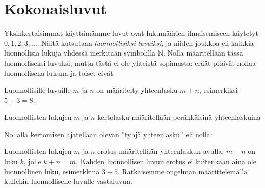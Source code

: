 
% 
% 
% 


% 
% 
% 

\chapter{Kokonaisluvut}

Yksinkertaisimmat käyttämämme luvut ovat lukumäärien ilmaisemiseen käytetyt $0, 1, 2, 3, \ldots$. Näitä kutsutaan \emph{luonnollisiksi luvuiksi}, ja niiden joukkoa eli kaikkia luonnollisia lukuja yhdessä merkitään symbolilla $\mathbb{N}$.
Nolla määritellään tässä luonnolliseksi luvuksi, mutta tästä ei ole yhteistä sopimusta: eräät pitävät nollaa luonnollisena lukuna ja toiset eivät.

Luonnollisille luvuille $m$ ja $n$ on määritelty yhteenlasku $m + n$, esimerkiksi $5 + 3 = 8$.

Luonnollisten lukujen $m$ ja $n$ kertolasku määritellään peräkkäisinä yhteenlaskuina
\laatikko{
\[m \cdot n = \underbrace{m + m + \ldots + m}_{n\text{ kpl}} = \underbrace{n + n + \ldots + n}_{m\text{ kpl}}.\]
}

Nollalla kertomisen ajatellaan olevan ''tyhjä yhteenlasku'' eli nolla:

\laatikko{
\[0 \cdot m = 0\]
}

Luonnollisten lukujen $m$ ja $n$ erotus määritellään yhteenlaskun avulla:
$m-n$ on luku $k$, jolle $k + n = m$. Kahden luonnollisen luvun erotus
ei kuitenkaan aina ole luonnollinen luku, esimerkkinä $3 - 5$.
Ratkaisemme ongelman määrittelemällä kullekin luonnolliselle
luvulle vastaluvun.

